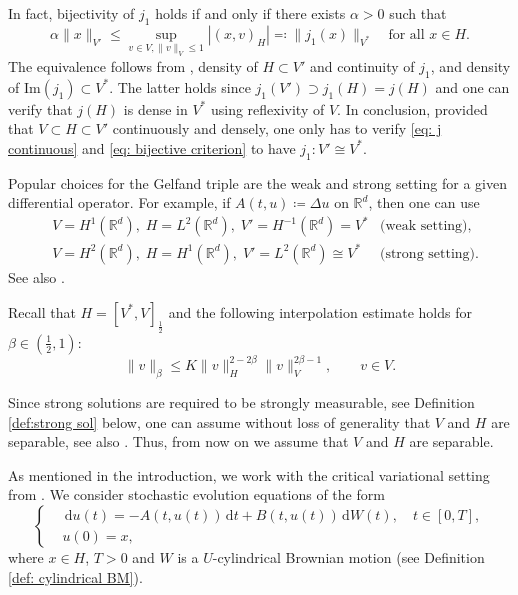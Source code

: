 \documentclass{amsart}
\newcommand{\dd}{\,\mathrm{d}}
\newcommand{\<}{\langle}
\newcommand{\?}{\rangle}
\theoremstyle{plain}
\theoremstyle{remark}
\theoremstyle{plain}
\numberwithin{equation}{section}
\def\R{{\mathbb R}}
\begin{document}
In fact, bijectivity of $j_1$ holds if and only if there exists $\alpha>0$ such that
\begin{equation}\label{eq: bijective criterion}
\alpha\|x\|_{V'}\leq\sup_{v\in V, \|v\|_V\leq 1}|(x,v)_H|\eqqcolon \|j_1(x)\|_{V^*} \quad \text{for all }x\in H.
\end{equation}
The equivalence follows from \cite[Th. 4.48]{rynne08}, density of $H\subset V'$ and continuity of $j_1$, and density of $\mathrm{Im}(j_1)\subset V^*$. The latter holds since $j_1(V')\supset j_1(H)=j(H)$ and one can verify that $j(H)$ is dense in $V^*$ using reflexivity of $V$. In conclusion, provided that $V\subset H\subset V'$ continuously and densely, one only has to verify \eqref{eq: j continuous} and \eqref{eq: bijective criterion} to have $j_1\colon V'\cong V^*$.

Popular choices for the Gelfand triple are the weak and strong setting for a given differential operator. For example, if $A(t,u)\coloneqq\Delta u$ on $\R^d$, then one can use
\begin{align*}
&V=H^1(\R^d),\; H=L^2(\R^d),\; V'=H^{-1}(\R^d)= V^*  &\text{(weak setting)},\\
  & V=H^2(\R^d),\; H=H^1(\R^d),\; V'=L^2(\R^d)\cong V^* &\text{(strong setting)}.
\end{align*}
See also \cite[Ex. 2.1, Ex. 2.2]{AV22variational}.

Recall that $H=[V^*,V]_{\frac{1}{2}}$ \cite[\S 5.5.2]{arendt02} and the following interpolation estimate holds for $\beta\in(\frac{1}{2},1)$:
\begin{equation}\label{eq:interpolation estimate}
\|v\|_\beta\leq K\|v\|_H^{2-2\beta}\|v\|_V^{2\beta-1}, \qquad v\in V.
\end{equation}

Since strong solutions are required to be strongly measurable, see Definition \ref{def:strong sol} below, one can assume without loss of generality that $V$ and $H$ are separable, see also \cite[p. 1244]{krylov81}.
Thus, from now on we assume that $V$ and $H$ are separable.

As mentioned in the introduction, we work with the critical variational setting from \cite{AV22variational}.
We consider stochastic evolution equations of the form
\begin{equation}\label{eq: original stoch ev eq}
  \begin{cases}
  &\dd u(t)=-A(t,u(t))\dd t+B(t,u(t))\dd W(t), \quad t\in[0,T], \\
  &u(0)=x,
\end{cases}
\end{equation}
where $x\in H$, $T>0$ and $W$ is a $U$-cylindrical Brownian motion (see Definition \ref{def: cylindrical BM}).
\end{document}
